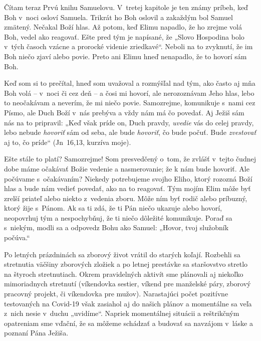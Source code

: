 


Čítam teraz Prvú knihu Samuelovu. V~tretej kapitole je ten známy príbeh, keď Boh v~noci osloví Samuela. Trikrát ho Boh oslovil a zakaždým bol Samuel zmätený. Nečakal Boží hlas. Až potom, keď Elimu napadlo, že ho zrejme volá Boh, vedel ako reagovať. Ešte pred tým je napísané, že „Slovo Hospodina bolo v~tých časoch vzácne a prorocké videnie zriedkavé“. Neboli na to zvyknutí, že im Boh niečo zjaví alebo povie. Preto ani Elimu hneď nenapadlo, že to hovorí sám Boh.

Keď som si to prečítal, hneď som uvažoval a rozmýšľal nad tým, ako často aj mňa Boh volá – v~noci či cez deň – a čosi mi hovorí, ale nerozoznávam Jeho hlas, lebo to neočakávam a neverím, že mi niečo povie. Samozrejme, komunikuje s~nami cez Písmo, ale Duch Boží v~nás prebýva a vždy nám má čo povedať. Aj Ježiš sám nás na to pripravil: „Keď však príde on, Duch pravdy, {\it uvedie} vás do celej pravdy, lebo nebude {\it hovoriť} sám od seba, ale bude {\it hovoriť}, čo bude počuť. Bude {\it zvestovať} aj to, čo príde“ (Jn~16,13, kurzíva moje).

Ešte stále to platí? Samozrejme! Som presvedčený o~tom, že zvlášť v~tejto čudnej dobe máme očakávať Božie vedenie a nasmerovanie; že k nám bude hovoriť. Ale počúvame s~očakávaním? Niekedy potrebujeme svojho Eliho, ktorý rozozná Boží hlas a bude nám vedieť povedať, ako na to reagovať. Tým mojím Elim môže byť zrelší priateľ alebo niekto z~vedenia zboru. Môže ním byť rodič alebo príbuzný, ktorý žije s~Pánom. Ak sa ti zdá, že ti Pán niečo ukazuje alebo hovorí, neopovrhuj tým a nespochybňuj, že ti niečo dôležité komunikuje. Poraď sa s~niekým, modli sa a odpovedz Bohu ako Samuel: „Hovor, tvoj služobník počúva.“



Po letných prázdninách sa zborový život vrátil do starých koľají. Rozbehli sa stretnutia väčšiny zborových zložiek a po letnej prestávke sa staršovstvo stretlo na štyroch stretnutiach. Okrem pravidelných aktivít sme plánovali aj niekoľko mimoriadnych stretnutí (víkendovka sestier, víkend pre manželské páry, zborový pracovný projekt, či víkendovka pre mužov). Narastajúci počet pozitívne testovaných na Covid-19 však zasiahol aj do našich plánov a momentálne sa veľa z~nich nesie v~duchu „uvidíme“. Napriek momentálnej situácii a reštrikčným opatreniam sme vďační, že sa môžeme schádzať a budovať sa navzájom v~láske a poznaní Pána Ježiša.

